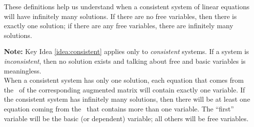 
These definitions help us understand when a consistent system of linear equations will have infinitely many solutions. If there are no free variables, then there is exactly one solution; if there are any free variables, there are infinitely many solutions. 

\smallskip


\smallskip

\textsf{\textbf{Note:}} Key Idea \ref{idea:consistent} applies only to \textit{consistent} systems. If a system is \textit{inconsistent}, then no solution exists and talking about free and basic variables is meaningless.\\

When a consistent system has only one solution, each equation that comes from the \rref\ of the corresponding augmented matrix will contain exactly one variable. If the consistent system has infinitely many solutions, then there will be at least one equation coming from the \rref\ that contains more than one variable. The ``first'' variable will be the basic (or dependent) variable; all others will be free variables. 

